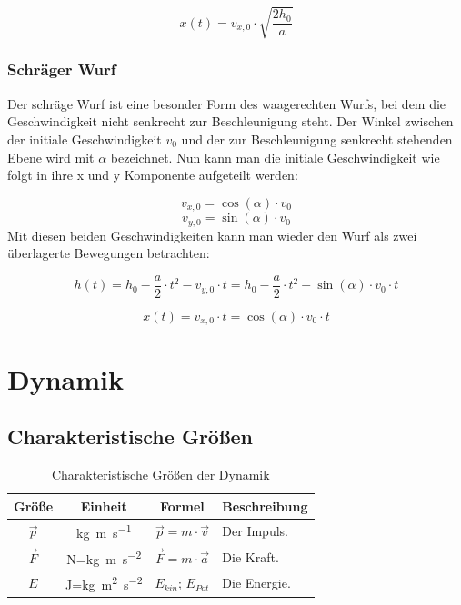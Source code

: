 \documentclass[a4paper]{article}
\begin{document}
				\begin{equation}
					x(t) = v_{x,0}\cdot\sqrt{\frac{2h_0}{a}}
				\end{equation}
				
			\subsubsection{Schräger Wurf}
				Der schräge Wurf ist eine besonder Form des waagerechten Wurfs, bei dem die Geschwindigkeit nicht senkrecht zur Beschleunigung steht. Der Winkel zwischen der initiale Geschwindigkeit $v_0$ und der zur Beschleunigung senkrecht stehenden Ebene wird mit $\alpha$ bezeichnet. Nun kann man die initiale Geschwindigkeit wie folgt in ihre x und y Komponente aufgeteilt werden:
				
				\begin{equation}
					v_{x,0} = \cos(\alpha)\cdot v_0
				\end{equation}
				\begin{equation}
					v_{y,0} = \sin(\alpha)\cdot v_0
				\end{equation}
				Mit diesen beiden Geschwindigkeiten kann man wieder den Wurf als zwei \"uberlagerte Bewegungen betrachten:
				
				\begin{equation}
					h(t) = h_0 - \frac{a}{2}\cdot t^2 - v_{y,0}\cdot t = h_0 - \frac{a}{2}\cdot t^2 - \sin(\alpha)\cdot v_0\cdot t
				\end{equation}
				
				\begin{equation}
					x(t) = v_{x,0}\cdot t = \cos(\alpha)\cdot v_0\cdot t
				\end{equation}
			
	\section{Dynamik}
		\subsection{Charakteristische Größen}
	
			\begin{table}[H]
				\def\arraystretch{1.5}
				\begin{tabularx}{\textwidth}{|c|c|c|X|}\hline
					Größe & Einheit & Formel & Beschreibung \\\hline
					$\vec{p}$ & \si{\kg\meter\per\second} & $\vec{p} = m\cdot \vec{v}$ & Der Impuls.\\\hline
					$\vec{F}$ & \si{\newton}=\si{\kg\meter\per\second\squared}  & $	\vec{F} = m\cdot \vec{a}$ & Die Kraft.\\\hline
					$E$ & \si{\joule}=\si{\kg\meter\squared\per\second\squared} &\hyperref[energie_kin]{$E_{kin}$}; \hyperref[energie_pot]{$E_{Pot}$}  & Die Energie.\\\hline
				\end{tabularx}
				\caption {Charakteristische Größen der Dynamik}
				\label{table:dynamik_grossen}
			\end{table}
	
\end{document}
